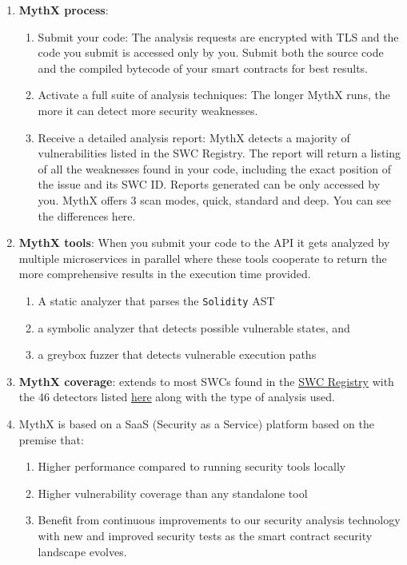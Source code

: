 \begin{enumerate}
\item\textbf{MythX process}:
	\begin{enumerate}
	\item Submit your code: The analysis requests are encrypted with TLS and the code you submit is accessed only by you. Submit both the source code and the compiled bytecode of your smart contracts for best results.
	\item Activate a full suite of analysis techniques: The longer MythX runs, the more it can detect more security weaknesses.
	\item Receive a detailed analysis report: MythX detects a majority of vulnerabilities listed in the SWC Registry. The report will return a listing of all the weaknesses found in your code, including the exact position of the issue and its SWC ID. Reports generated can be only accessed by you. MythX offers 3 scan modes, quick, standard and deep. You can see the differences here.
	\end{enumerate}

\item\textbf{MythX tools}: When you submit your code to the API it gets analyzed by multiple microservices in parallel where these tools cooperate to return the more comprehensive results in the execution time provided.
	\begin{enumerate}
	\item A static analyzer that parses the \verb|Solidity| AST
	\item a symbolic analyzer that detects possible vulnerable states, and
	\item a greybox fuzzer that detects vulnerable execution paths
	\end{enumerate}

\item\textbf{MythX coverage}: extends to most SWCs found in the \href{https://swcregistry.io/}{SWC Registry} with the 46 detectors listed \href{https://mythx.io/detectors/}{here} along with the type of analysis used.

\item MythX is based on a SaaS (Security as a Service) platform based on the premise that:
	\begin{enumerate}
	\item Higher performance compared to running security tools locally
	\item Higher vulnerability coverage than any standalone tool
	\item Benefit from continuous improvements to our security analysis technology with new and improved security tests as the smart contract security landscape evolves.
	\end{enumerate}


\end{enumerate}
